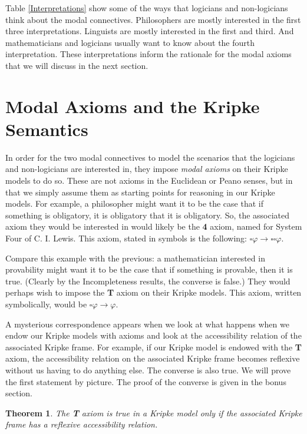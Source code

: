 \documentclass[12pt]{article}
\renewcommand{\phi}{\varphi}
\newtheorem{theorem}{Theorem}[section]
\begin{document}
Table \ref{Interpretations} show some of the ways that logicians and non-logicians think about the modal connectives. Philosophers are mostly
interested in the first three interpretations. Linguists are mostly interested in the first and third. And mathematicians and logicians usually
want to know about the fourth interpretation. These interpretations inform the rationale for the modal axioms that we will discuss in the 
next section.

\section{Modal Axioms and the Kripke Semantics}

In order for the two modal connectives to model the scenarios that the logicians and non-logicians are interested in, they impose \emph{modal
axioms} on their Kripke models to do so. These are not axioms in the Euclidean or Peano senses, but in that we simply assume them as starting 
points for reasoning in our Kripke models. For example, a philosopher might want it to be the case that if something is obligatory, it is
obligatory that it is obligatory. So, the associated axiom they would be interested in would likely be the \textbf{4} axiom, named for 
System Four of C. I. Lewis. This axiom, stated in symbols is the following: $\square \phi \rightarrow \square \square \phi$. 

Compare this example with the previous: a mathematician interested in provability might want it to be the case that if something is provable, 
then it is true. (Clearly by the Incompleteness results, the converse is false.) They would perhaps wish to impose the \textbf{T} axiom on 
their Kripke models. This axiom, written symbolically, would be $\square \phi \rightarrow \phi$. 

A mysterious correspondence appears when we look at what happens when we endow our Kripke models with axioms and look at the accessibility
relation of the associated Kripke frame. For example, if our Kripke model is endowed with the \textbf{T} axiom, the accessibility 
relation on the associated Kripke frame becomes reflexive without us having to do anything else. The converse is also true. We will prove the 
first statement by picture. The proof of the converse is given in the bonus section. 

\begin{theorem}
    The \textbf{T} axiom is true in a Kripke model only if the associated Kripke frame has a reflexive accessibility relation.
\end{theorem}
\end{document}
